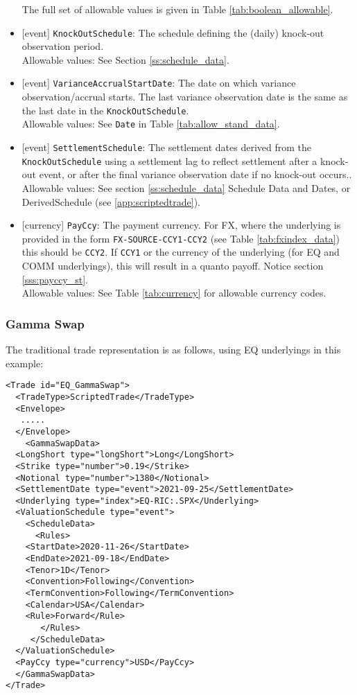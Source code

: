 \begin{itemize}
  The full set of allowable values is given in Table \ref{tab:boolean_allowable}.
  \item{}[event] \lstinline!KnockOutSchedule!: The schedule defining the (daily) knock-out observation period. \\
  Allowable values: See Section \ref{ss:schedule_data}.
  \item{}[event] \lstinline!VarianceAccrualStartDate!: The date on which variance observation/accrual starts. The last variance
  observation date is the same as the last date in the \lstinline!KnockOutSchedule!.  \\
  Allowable values: See \lstinline!Date! in Table \ref{tab:allow_stand_data}.
  \item{}[event] \lstinline!SettlementSchedule!: The settlement dates derived from the \lstinline!KnockOutSchedule! using a
  settlement lag to reflect settlement after a knock-out event, or after the final variance observation date if
  no knock-out occurs.. \\
  Allowable values: See section \ref{ss:schedule_data} Schedule Data and Dates, or DerivedSchedule (see \ref{app:scriptedtrade}).
  \item{}[currency] \lstinline!PayCcy!: The payment currency. For FX, where the underlying is provided
      in the form \lstinline!FX-SOURCE-CCY1-CCY2! (see Table \ref{tab:fxindex_data}) this should
      be \lstinline!CCY2!. If \lstinline!CCY1! or the currency of the underlying (for EQ and
      COMM underlyings), this will result in a quanto payoff. Notice section \ref{sss:payccy_st}. \\
        Allowable values: See Table \ref{tab:currency} for allowable currency codes.
\end{itemize}

\subsubsection*{Gamma Swap}

The traditional trade representation is as follows, using EQ underlyings in this example:

\begin{verbatim}
<Trade id="EQ_GammaSwap">
  <TradeType>ScriptedTrade</TradeType>
  <Envelope>
   .....
  </Envelope>
    <GammaSwapData>
  <LongShort type="longShort">Long</LongShort>
  <Strike type="number">0.19</Strike>
  <Notional type="number">1380</Notional>
  <SettlementDate type="event">2021-09-25</SettlementDate>
  <Underlying type="index">EQ-RIC:.SPX</Underlying>
  <ValuationSchedule type="event">
    <ScheduleData>
      <Rules>
    <StartDate>2020-11-26</StartDate>
    <EndDate>2021-09-18</EndDate>
    <Tenor>1D</Tenor>
    <Convention>Following</Convention>
    <TermConvention>Following</TermConvention>
    <Calendar>USA</Calendar>
    <Rule>Forward</Rule>
       </Rules>
     </ScheduleData>
  </ValuationSchedule>
  <PayCcy type="currency">USD</PayCcy>
  </GammaSwapData>
</Trade>
\end{verbatim}

